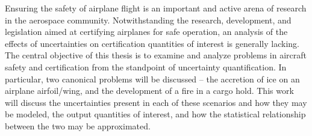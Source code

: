 
Ensuring the safety of airplane flight is an important and active
arena of research in the aerospace community. Notwithstanding the
research, development, and legislation aimed at certifying airplanes
for safe operation, an analysis of the effects of uncertainties on
certification quantities of interest is generally lacking. The central
objective of this thesis is to examine and analyze problems in
aircraft safety and certification from the standpoint of uncertainty
quantification. In particular, two canonical problems will be
discussed -- the accretion of ice on an airplane airfoil/wing, and the
development of a fire in a cargo hold. This work will discuss the
uncertainties present in each of these scenarios and how they may be
modeled, the output quantities of interest, and how the statistical
relationship between the two may be approximated.

